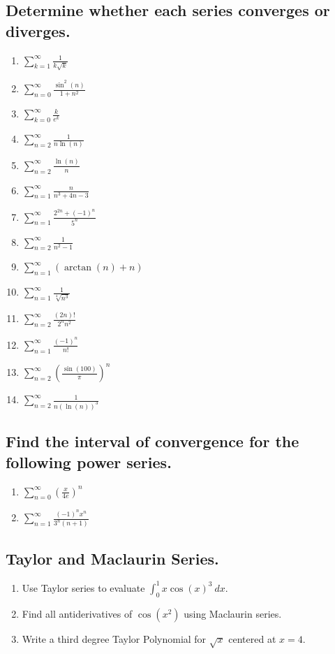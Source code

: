 \documentclass{article}
\begin{document}
\subsection{Determine whether each series converges or diverges.}
\begin{multicols}{4}
\begin{enumerate}
\item $\displaystyle \sum_{k=1}^{\infty} \frac{1}{k \sqrt{k}}$
\item $\displaystyle \sum_{n=0}^{\infty} \frac{\sin ^2(n)}{1+n^2}$
\item $\displaystyle \sum_{k=0}^{\infty} \frac{k}{e^k}$
\item $\displaystyle \sum_{n=2}^{\infty} \frac{1}{n \ln (n)}$
\item $\displaystyle \sum_{n=2}^{\infty} \frac{\ln(n)}{n}$
\item $\displaystyle \sum_{n=1}^{\infty} \frac{n}{n^3+4 n-3}$
\item $\displaystyle \sum_{n=1}^{\infty} \frac{2^{2 n}+(-1)^n}{5^n}$
\item $\displaystyle \sum_{n=2}^{\infty} \frac{1}{n^2-1}$
\item $\displaystyle \sum_{n=1}^{\infty}( \arctan(n)+n)$
\item $\displaystyle \sum_{n=1}^{\infty}\frac{1}{\sqrt[4]{n^3}}$
\item $\displaystyle \sum_{n=2}^{\infty}\frac{(2n)!}{2^nn^2}$
\item $\displaystyle \sum_{n=1}^{\infty}\frac{(-1)^n}{n!}$
\item $\displaystyle \sum_{n=2}^{\infty}\left(\frac{\sin(100)}{\pi}\right)^n$
\item $\displaystyle \sum_{n=2}^{\infty}\frac{1}{n(\ln(n))^3}$
\end{enumerate}
\end{multicols}


\subsection{Find the interval of convergence for the following power series.}
\begin{multicols}{4}
\begin{enumerate}
\item $\displaystyle\sum_{n=0}^\infty \left(\frac{x}{4e}\right)^n$
\item $\displaystyle\sum_{n=1}^\infty \frac{(-1)^nx^n}{3^n(n+1)}$
\end{enumerate}
\end{multicols}


\subsection{Taylor and Maclaurin Series.}
\begin{enumerate}
\item Use Taylor series to evaluate $\displaystyle\int_0^1x\cos(x)^3\ dx$.
\item Find all antiderivatives of $\cos(x^2)$ using Maclaurin series.
\item Write a third degree Taylor Polynomial for $\sqrt{x}$ centered at $x = 4$.
\end{enumerate}
\end{document}
